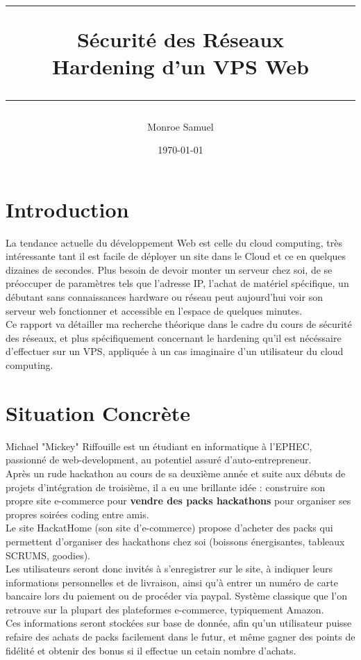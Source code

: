 \documentclass[a4paper,10pt,final,fleqn]{article}
\title{
\parbox{15cm}
{ %
  \vspace{3cm}
	\begin{center}\sf\bfseries\Huge
		\rule{15cm}{1pt}
		\medskip
		Sécurité des Réseaux \\
		\huge Hardening d'un VPS Web
		\vspace{.5cm}
		\rule{15cm}{1pt}
	\end{center}
	\vspace{3cm}
 }}
\author{Monroe Samuel}
\date{\today}
\begin{document}
\maketitle
\newpage

	\section{Introduction}

		La tendance actuelle du développement Web est celle du cloud computing, très intéressante tant il est facile de déployer un site dans le Cloud et ce en quelques dizaines de secondes. Plus besoin de devoir monter un serveur chez soi, de se préoccuper de paramètres tels que l'adresse IP, l'achat de matériel spécifique, un débutant sans connaissances hardware ou réseau peut aujourd'hui voir son serveur web fonctionner et accessible en l'espace de quelques minutes.\\

		Ce rapport va détailler ma recherche théorique dans le cadre du cours de sécurité des réseaux, et plus spécifiquement concernant le hardening qu'il est nécéssaire d'effectuer sur un VPS, appliquée à un cas imaginaire d'un utilisateur du cloud computing.


	\section{Situation Concrète}

		Michael "Mickey" Riffouille est un étudiant en informatique à l'EPHEC, passionné de web-development, au potentiel assuré d'auto-entrepreneur.\\
		Après un rude hackathon au cours de sa deuxième année et suite aux débuts de projets d'intégration de troisième, il a eu une brillante idée : construire son propre site e-commerce pour \textbf{vendre des packs hackathons} pour organiser ses propres soirées coding entre amis.\\

		Le site HackatHome (son site d'e-commerce) propose d'acheter des packs qui permettent d'organiser des hackathons chez soi (boissons énergisantes, tableaux SCRUMS, goodies).\\

		Les utilisateurs seront donc invités à s'enregistrer sur le site, à indiquer leurs informations personnelles et de livraison, ainsi qu'à entrer un numéro de carte bancaire lors du paiement ou de procéder via paypal. Système classique que l'on retrouve sur la plupart des plateformes e-commerce, typiquement Amazon.\\
		Ces informations seront stockées sur base de donnée, afin qu'un utilisateur puisse refaire des achats de packs facilement dans le futur, et même gagner des points de fidélité et obtenir des bonus si il effectue un cetain nombre d'achats.\\
\end{document}
